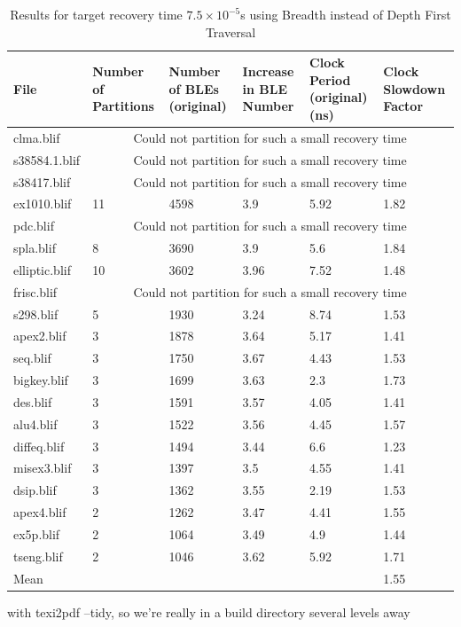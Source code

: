 \documentclass[12pt,final,oneside]{dwThesis} %
\begin{document}
         \begin{table} \footnotesize \begin{adjustwidth}{-1cm}{-1.2cm}
               \begin{tabularx}{1.1\textwidth}{XXXXXX} \toprule File & Number
                  of Partitions &  Number of BLEs (original) &  Increase in BLE
                  Number &  Clock Period (original) (ns) &  Clock Slowdown
                  Factor\\ \midrule

   clma.blif      & \multicolumn{5}{c}{Could not partition for such a small
      recovery time}\\ s38584.1.blif  &  \multicolumn{5}{c}{Could not partition
      for such a small recovery time}\\ s38417.blif    &
   \multicolumn{5}{c}{Could not partition for such a small recovery time}\\
   ex1010.blif    & 11 & 4598 & 3.9 & 5.92 & 1.82\\ pdc.blif       &
   \multicolumn{5}{c}{Could not partition for such a small recovery time}\\
   spla.blif      & 8 & 3690 & 3.9 & 5.6 & 1.84\\ elliptic.blif  & 10 & 3602 &
   3.96 & 7.52 & 1.48\\ frisc.blif     &   \multicolumn{5}{c}{Could not
      partition for such a small recovery time}\\ s298.blif      & 5 & 1930 &
   3.24 & 8.74 & 1.53\\ apex2.blif     & 3 & 1878 & 3.64 & 5.17 & 1.41\\
   seq.blif       & 3 & 1750 & 3.67 & 4.43 & 1.53\\ bigkey.blif    & 3 & 1699 &
   3.63 & 2.3 & 1.73\\ des.blif       & 3 & 1591 & 3.57 & 4.05 & 1.41\\
   alu4.blif      & 3 & 1522 & 3.56 & 4.45 & 1.57\\ diffeq.blif    & 3 & 1494 &
   3.44 & 6.6 & 1.23\\ misex3.blif    & 3 & 1397 & 3.5 & 4.55 & 1.41\\
   dsip.blif      & 3 & 1362 & 3.55 & 2.19 & 1.53\\ apex4.blif     & 2 & 1262 &
   3.47 & 4.41 & 1.55\\ ex5p.blif      & 2 & 1064 & 3.49 & 4.9 & 1.44\\
   tseng.blif     & 2 & 1046 & 3.62 & 5.92 & 1.71\\ Mean    &  &  &  & &1.55\\
   \bottomrule \end{tabularx} \caption{Results for target recovery time
   $7.5\times10^{-5}$s using Breadth instead of Depth First Traversal}
\label{Results7.5e-5DFS} \end{adjustwidth} \end{table}
   
   with texi2pdf --tidy, so we're really in a build directory several levels
   away
   
\end{document}
